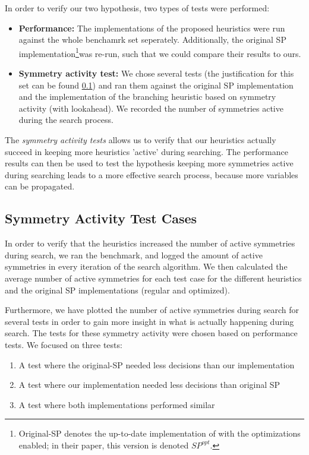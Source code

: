 
In order to verify our two hypothesis, two types of tests were performed:

\begin{itemize}
	\item {\bf Performance:}
		The implementations of the proposed heuristics were run against the whole
		benchamrk set seperately.
		Additionally, the original SP implementation\footnote{
			Original-SP denotes the up-to-date implementation of \cite{devriendt2012symmetry} with
			the optimizations enabled; in their paper, this version is denoted $SP^{opt}$.
		}was re-run, such that we could compare their
		results to ours.

	\item {\bf Symmetry activity test:}
		We chose several tests (the justification for this set can be found
		\ref{ssec:sym_act_test_cases}) and ran them against the original SP implementation and the
		implementation of the branching heuristic based on symmetry activity (with lookahead).
		We recorded the number of symmetries active during the search process.

\end{itemize}

The \emph{symmetry activity tests} allows us to verify that our heuristics actually succeed in
keeping more heuristics 'active' during searching.
The performance results can then be used to test the hypothesis
keeping more symmetries active during searching leads to a more effective search process,
because more variables can be propagated.

\subsection{Symmetry Activity Test Cases}
\label{ssec:sym_act_test_cases}
	In order to verify that the heuristics increased the number of active symmetries during search,
	we ran the benchmark, and logged the amount of active symmetries in every iteration of the
	search algorithm.
	We then calculated the average number of active symmetries for each test case for the different
	heuristics and the original SP implementations (regular and optimized).

	Furthermore, we have plotted the number of active symmetries during search for several tests in
	order to gain more insight in what is actually happening during search.
	The tests for these symmetry activity were chosen based on performance tests.
	We focused on three tests:
	\begin{enumerate}
		\item A test where the original-SP needed less decisions than our implementation
		\item A test where our implementation needed less decisions than original SP
		\item A test where both implementations performed similar
	\end{enumerate}

